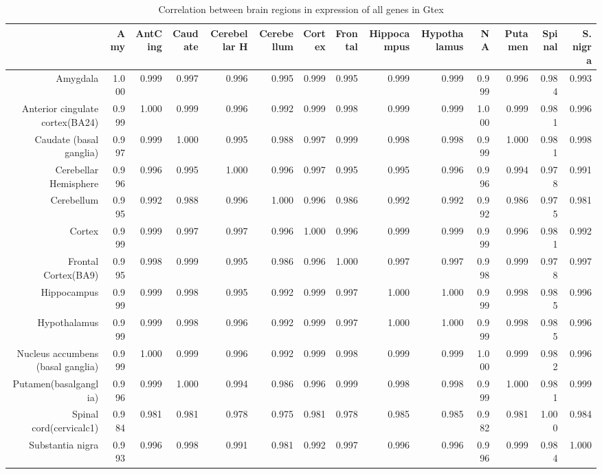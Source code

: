 \begin{table}[ht]
\centering
\begin{adjustbox}{width=\textwidth}
\begin{tabular}{rrrrrrrrrrrrrr}
  \hline
 & Amy & AntCing & Caudate & Cerebellar H & Cerebellum & Cortex & Frontal & Hippocampus & Hypothalamus & NA & Putamen & Spinal & S. nigra \\ 
  \hline
Amygdala & 1.000 & 0.999 & 0.997 & 0.996 & 0.995 & 0.999 & 0.995 & 0.999 & 0.999 & 0.999 & 0.996 & 0.984 & 0.993 \\ 
  Anterior cingulate cortex(BA24) & 0.999 & 1.000 & 0.999 & 0.996 & 0.992 & 0.999 & 0.998 & 0.999 & 0.999 & 1.000 & 0.999 & 0.981 & 0.996 \\ 
  Caudate (basal ganglia) & 0.997 & 0.999 & 1.000 & 0.995 & 0.988 & 0.997 & 0.999 & 0.998 & 0.998 & 0.999 & 1.000 & 0.981 & 0.998 \\ 
  Cerebellar Hemisphere & 0.996 & 0.996 & 0.995 & 1.000 & 0.996 & 0.997 & 0.995 & 0.995 & 0.996 & 0.996 & 0.994 & 0.978 & 0.991 \\ 
  Cerebellum & 0.995 & 0.992 & 0.988 & 0.996 & 1.000 & 0.996 & 0.986 & 0.992 & 0.992 & 0.992 & 0.986 & 0.975 & 0.981 \\ 
  Cortex & 0.999 & 0.999 & 0.997 & 0.997 & 0.996 & 1.000 & 0.996 & 0.999 & 0.999 & 0.999 & 0.996 & 0.981 & 0.992 \\ 
  Frontal Cortex(BA9) & 0.995 & 0.998 & 0.999 & 0.995 & 0.986 & 0.996 & 1.000 & 0.997 & 0.997 & 0.998 & 0.999 & 0.978 & 0.997 \\ 
  Hippocampus & 0.999 & 0.999 & 0.998 & 0.995 & 0.992 & 0.999 & 0.997 & 1.000 & 1.000 & 0.999 & 0.998 & 0.985 & 0.996 \\ 
  Hypothalamus & 0.999 & 0.999 & 0.998 & 0.996 & 0.992 & 0.999 & 0.997 & 1.000 & 1.000 & 0.999 & 0.998 & 0.985 & 0.996 \\ 
  Nucleus accumbens (basal ganglia) & 0.999 & 1.000 & 0.999 & 0.996 & 0.992 & 0.999 & 0.998 & 0.999 & 0.999 & 1.000 & 0.999 & 0.982 & 0.996 \\ 
  Putamen(basalganglia) & 0.996 & 0.999 & 1.000 & 0.994 & 0.986 & 0.996 & 0.999 & 0.998 & 0.998 & 0.999 & 1.000 & 0.981 & 0.999 \\ 
  Spinal cord(cervicalc1) & 0.984 & 0.981 & 0.981 & 0.978 & 0.975 & 0.981 & 0.978 & 0.985 & 0.985 & 0.982 & 0.981 & 1.000 & 0.984 \\ 
  Substantia nigra & 0.993 & 0.996 & 0.998 & 0.991 & 0.981 & 0.992 & 0.997 & 0.996 & 0.996 & 0.996 & 0.999 & 0.984 & 1.000 \\ 
   \hline
\end{tabular}
\end{adjustbox}
\caption{Correlation between brain regions in expression of all genes in Gtex}
\label{Correlation between brain regions in expression of all genes in Gtex}
\end{table}

